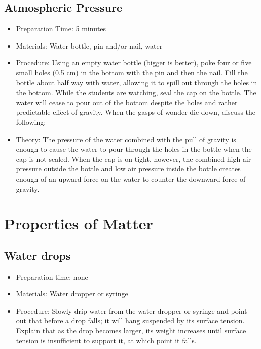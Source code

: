 \subsection{Atmospheric Pressure}
\begin{itemize}
\item{Preparation Time: 5 minutes}
\item{Materials: Water bottle, pin and/or nail, water}
\item{Procedure: Using an empty water bottle (bigger is better), poke four or five small holes (0.5 cm) in the bottom with the pin and then the nail. Fill the bottle about half way with water, allowing it to spill out through the holes in the bottom. While the students are watching, seal the cap on the bottle. The water will cease to pour out of the bottom despite the holes and rather predictable effect of gravity. When the gasps of wonder die down, discuss the following:}
\item{Theory: The pressure of the water combined with the pull of gravity is enough to cause the water to pour through the holes in the bottle when the cap is not sealed. When the cap is on tight, however, the combined high air pressure outside the bottle and low air pressure inside the bottle creates enough of an upward force on the water to counter the downward force of gravity.}
\end{itemize}

\section{Properties of Matter}

\subsection{Water drops}
\begin{itemize}
\item{Preparation time: none}
\item{Materials: Water dropper or syringe}
\item{Procedure: Slowly drip water from the water dropper or syringe and point out that before a drop falls; it will hang suspended by its surface tension. Explain that as the drop becomes larger, its weight increases until surface tension is insufficient to support it, at which point it falls.}
\end{itemize}


